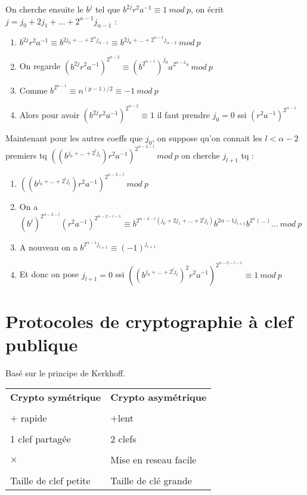\documentclass[12pt]{article}
\theoremstyle{plain}
\theoremstyle{definition}
\begin{document}
On cherche ensuite le $b^j$ tel que $b^{2j}r^2a^{-1}\equiv1~mod~p$, on écrit $j=j_0+2j_1+...+2^{\alpha-1}j_{\alpha-1}$ :
\begin{enumerate}
    \item $b^{2j}r^2a^{-1}\equiv b^{2j_0+...+2^{\alpha}j_{\alpha-1}}\equiv b^{2j_0+...+2^{\alpha-1}j_{\alpha-2}}~mod~p$
    \item On regarde $(b^{2j}r^2a^{-1})^{2^{\alpha-2}}\equiv (b^{2^{\alpha-1}})^{j_0}a^{2^{\alpha-2}s}~mod~p$
    \item Comme $b^{2^{\alpha-1}}\equiv n^{(p-1)/2}\equiv -1~mod~p$
    \item Alors pour avoir $(b^{2j}r^2a^{-1})^{2^{\alpha-2}}\equiv 1$ il faut prendre $j_0=0$ ssi $(r^2a^{-1})^{2^{\alpha-1}}$
\end{enumerate}
Maintenant pour les autres coeffs que $j_0$, on suppose qu'on connait les $l<\alpha-2$ premiers tq 
$((b^{j_0+...+2^{l}j_l})r^2a^{-1})^{2^{\alpha-2-l}}~mod~p$ on cherche $j_{l+1}$ tq :
\begin{enumerate}
    \item $((b^{j_0+...+2^{l}j_l})r^2a^{-1})^{2^{\alpha-2-l}}~mod~p$
    \item On a $(b^j)^{2^{\alpha-2-l}}(r^2a^{-1})^{2^{\alpha-2-l-1}}\equiv b^{2^{\alpha-2-l}(j_0+2j_1+...+2^lj_l)}b^{2{\alpha-1}j_{l+1}}b^{2^{\alpha}(...)}...~mod~p$
    \item A nouveau on a $b^{2^{\alpha-1}j_{l+1}}\equiv (-1)^{j_{l+1}}$
    \item Et donc on pose $j_{l+1}=0$ ssi $((b^{j_0+...+2^lj_l})^2r^2a^{-1})^{2^{\alpha-2-l-1}}\equiv 1~mod~p$
\end{enumerate}


\section{Protocoles de cryptographie à clef publique}
Basé sur le principe de Kerkhoff.\\
\newline
\begin{tabular}{M{8 cm}  M{8 cm}}
    \textbf{Crypto symétrique} & \textbf{Crypto asymétrique}\\
    \tabularnewline
    $+$ rapide & $+$lent\\
     clef partagée & $2$ clefs\\
    \tabularnewline
    $\times$ & Mise en reseau facile\\
    \tabularnewline
    Taille de clef petite & Taille de clé grande \\
\end{tabular}
\end{document}
